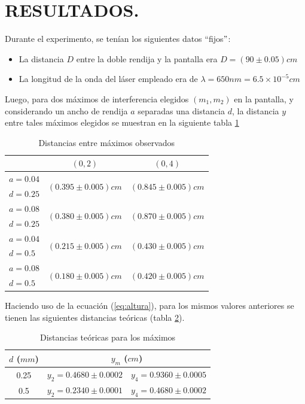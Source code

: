 \documentclass[12pt,a4paper]{article}
\begin{document}
\section{RESULTADOS.} %
	 Durante el experimento, se tenían los siguientes datos ``fijos$"$:
	 \begin{itemize}
	 	\item La distancia $ D $ entre la doble rendija y la pantalla era $ D=(90\pm 0.05) cm$
	 	\item La longitud de la onda del láser empleado era de $ \lambda=650 nm=6.5\times 10^{-5}cm $
	 \end{itemize}
 	Luego, para dos máximos de interferencia elegidos $ (m_1, m_2) $ en la pantalla, y considerando un ancho de rendija $ a $ separadas una distancia $ d $, la distancia $ y $ entre tales máximos elegidos se muestran en la siguiente tabla \ref{tab:distancias}
 	\begin{table}[!htb]
 		\centering
 		\caption{Distancias entre máximos observados}
 		\begin{tabular}{|c|c|c|}
 			\hline
			\backslashbox{$ a, d $ (\(mm\))}{$ (m_1,m_2) $}& $ (0,2) $ & $ (0,4) $ \\
 			\hline
 			$ a=0.04 $ & \multirow{2}{*}{$ (0.395\pm 0.005) cm $} & \multirow{2}{*}{$ (0.845\pm 0.005) cm $} \\ 		
 			$ d=0.25 $ &  & \\ 
 			\hline
 			$ a=0.08 $& \multirow{2}{*}{$ (0.380\pm 0.005) cm $} & \multirow{2}{*}{$ (0.870\pm 0.005) cm $} \\
 			$ d=0.25 $&  &  \\
 			\hline
 			$ a=0.04 $          & \multirow{2}{*}{$ (0.215\pm 0.005) cm $} & \multirow{2}{*}{$ (0.430\pm 0.005) cm $} \\ 		
 			$ d=0.5\phantom{0} $&  &  \\	
 			\hline
 			$ a=0.08 $           & \multirow{2}{*}{$ (0.180 \pm 0.005) cm $} & \multirow{2}{*}{$ (0.420 \pm 0.005) cm $} \\
 			$ d=0.5\phantom{0} $ &  &  \\
 			\hline
 		\end{tabular}
 		\label{tab:distancias}
 	\end{table}
	\newpage
		Haciendo uso de la ecuación (\ref{eq:altura}), para los mismos valores anteriores se tienen las siguientes distancias teóricas (tabla \ref{tab:disteo}).
 	\begin{table}[hbtp!]
 		\centering
 		\caption{Distancias teóricas para los máximos}
 		\begin{tabular}{|c|c|c|}
 			\hline
			$ d $ (\(mm\)) & \multicolumn{2}{c|}{$ y_m $ (\(cm\))}  \\
 			\hline
 			0.25 & $ y_2=0.4680\pm 0.0002 $ & $ y_4=0.9360\pm0.0005 $ \\
 			\hline
 			0.5 & $ y_2=0.2340\pm 0.0001 $ & $ y_4=0.4680\pm0.0002 $  \\
 			\hline
 		\end{tabular}
 		\label{tab:disteo}
 	\end{table}\\
\end{document}
